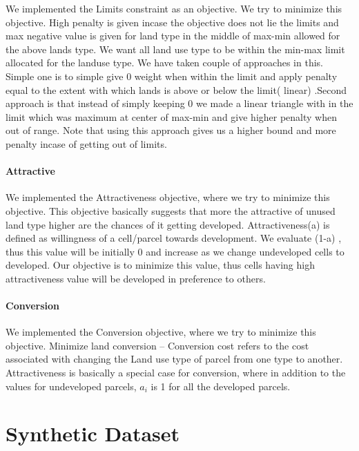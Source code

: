 \documentclass{sig-alternate}
\begin{document}
We implemented the Limits constraint as an  objective. We try to minimize this objective. High penalty is given incase the objective does not lie the limits and max negative value is given for land type in the middle of max-min allowed for the above lands type. We want all land use type to be within the min-max limit allocated for the landuse type. We have taken couple of approaches in this. Simple one is to simple give 0 weight when within the limit and apply penalty equal to the extent with which lands is above or below the limit( linear) .Second approach is that instead of simply keeping 0 we made a linear triangle with in the limit which was maximum at center of max-min and give higher penalty when out of range. Note that using this approach gives us a higher bound and more penalty incase of getting out of limits. 

\paragraph*{Attractive}

We implemented the Attractiveness  objective, where we try to minimize this objective. This objective basically suggests that more the attractive of unused land type higher are the chances of it getting developed. Attractiveness(a) is defined as willingness of a cell/parcel towards development. We evaluate (1-a) , thus this value will be initially 0 and increase as we change undeveloped cells to developed. Our objective is to minimize this value, thus cells having high attractiveness value will be developed in preference to others.

\paragraph*{Conversion}

We implemented the Conversion  objective, where we try to minimize this objective. Minimize land conversion -- Conversion cost refers to the cost associated with changing the Land use type of parcel from one type to another. Attractiveness is basically a special case for conversion, where in addition to the values for undeveloped parcels, $a_i$ is 1 for all the developed parcels.\\



\section{Synthetic Dataset}
\end{document}
